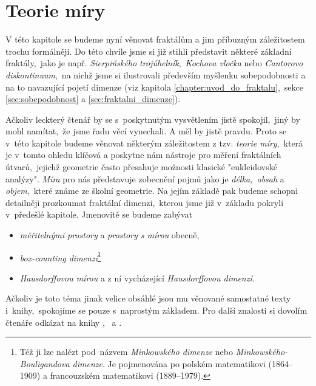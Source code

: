 \chapter{Teorie míry}\label{chapter:teorie-miry}

V této kapitole se budeme nyní věnovat fraktálům a jim příbuzným záležitostem trochu formálněji. Do této chvíle jsme si již stihli představit některé základní fraktály,~jako je např. \emph{Sierpińského trojúhelník},~\emph{Kochova vločka} nebo \emph{Cantorovo diskontinuum},~na nichž jsme si ilustrovali především myšlenku sobepodobnosti a na to navazující pojetí dimenze (viz kapitola \ref{chapter:uvod_do_fraktalu},~sekce \ref{sec:sobepodobnost} a \ref{sec:fraktalni_dimenze}).

Ačkoliv leckterý čtenář by se s~poskytnutým vysvětlením jistě spokojil,~jiný by mohl namítat,~že jsme řadu věcí vynechali. A měl by jistě pravdu. Proto se v~této kapitole budeme věnovat některým záležitostem z tzv. \emph{teorie míry},~která je v~tomto ohledu klíčová a poskytne nám nástroje pro měření fraktálních útvarů,~jejichž geometrie často přesahuje možnosti klasické "eukleidovské analýzy". \emph{Míra} pro nás představuje zobecnění pojmů jako je \emph{délka,~obsah} a \emph{objem},~které známe ze školní geometrie. Na jejím základě pak budeme schopni detailněji prozkoumat fraktální dimenzi,~kterou jsme již v~základu pokryli v~předešlé kapitole. Jmenovitě se budeme zabývat
\begin{itemize}
    \item \emph{měřitelnými prostory} a \emph{prostory s mírou} obecně,
    \item \emph{box-counting dimenzí}\footnote{Též ji lze nalézt pod~názvem \emph{Minkowského dimenze} nebo \emph{Minkowského-Bouligandova dimenze}. Je pojmenována po polském matematikovi  (1864--1909) a francouzském matematikovi  (1889--1979).} 
    \item \emph{Hausdorffovou mírou} a z ní vycházející \emph{Hausdorffovou dimenzí}.
\end{itemize}

Ačkoliv je toto téma jinak velice obsáhlé jsou mu věnované samostatné texty i~knihy,~spokojíme se pouze s~naprostým základem. Pro další znalosti si dovolím čtenáře odkázat na knihy \cite{Falconer2014},~\cite{Lukes2013} a \cite{Netuka2016}.





